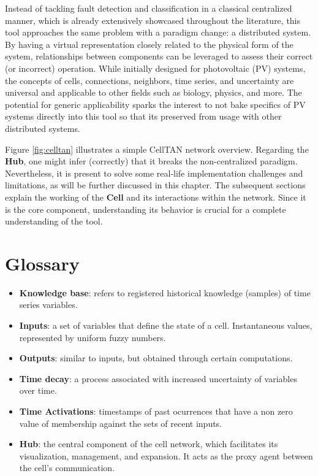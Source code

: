 Instead of tackling fault detection and classification in a classical centralized manner, which is already extensively showcased throughout the literature, this tool approaches the same problem with a paradigm change: a distributed system. By having a virtual representation closely related to the physical form of the system, relationships between components can be leveraged to assess their correct (or incorrect) operation. While initially designed for photovoltaic (PV) systems, the concepts of cells, connections, neighbors, time series, and uncertainty are universal and applicable to other fields such as biology, physics, and more. The potential for generic applicability sparks the interest to not bake specifics of PV systems directly into this tool so that its preserved from usage with other distributed systems.


Figure \ref{fig:celltan} illustrates a simple CellTAN network overview. Regarding the \textbf{Hub}, one might infer (correctly) that it breaks the non-centralized paradigm. Nevertheless, it is present to solve some real-life implementation challenges and limitations, as will be further discussed in this chapter. The subsequent sections explain the working of the \textbf{Cell} and its interactions within the network. Since it is the core component, understanding its behavior is crucial for a complete understanding of the tool.

\section{Glossary}

\begin{itemize}
    \item \textbf{Knowledge base}: refers to registered historical knowledge (samples) of time series variables.
    
    \item \textbf{Inputs}: a set of variables that define the state of a cell. Instantaneous values, represented by uniform fuzzy numbers.

    \item \textbf{Outputs}: similar to inputs, but obtained through certain computations.

    \item \textbf{Time decay}: a process associated with increased uncertainty of variables over time.
    
    \item \textbf{Time Activations}: timestamps of past ocurrences that have a non zero value of membership against the sets of recent inputs.

    \item \textbf{Hub}: the central component of the cell network, which facilitates its visualization, management, and expansion. It acts as the proxy agent between the cell's communication.
    
\end{itemize}

